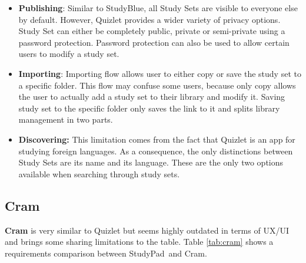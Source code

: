 \documentclass[thesis=B,english]{FITthesis}[2012/10/20]
\newcommand{\appname}{StudyPad}
\begin{document}
\begin{itemize}
	\item \textbf{Publishing}: Similar to StudyBlue, all Study Sets are visible to everyone else by default. However, Quizlet provides a wider variety of privacy options. Study Set can either be completely public, private or semi-private using a password protection. Password protection can also be used to allow certain users to modify a study set.
	\item \textbf{Importing}: Importing flow allows user to either copy or save the study set to a specific folder. This flow may confuse some users, because only copy allows the user to actually add a study set to their library and modify it. Saving study set to the specific folder only saves the link to it and splits library management in two parts.
	\item \textbf{Discovering:} This limitation comes from the fact that Quizlet is an app for studying foreign  languages. As a consequence, the only distinctions between Study Sets are its name and its language. These are the only two options available when searching through study sets.

\end{itemize}

\subsection{Cram}
\textbf{Cram} is very similar to Quizlet but seems highly outdated in terms of UX/UI and brings some sharing limitations to the table. Table \ref{tab:cram} shows a requirements comparison between \appname\ and Cram.
\end{document}
